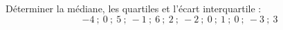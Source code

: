 \begin{exo}
	Déterminer la médiane, les quartiles et l'écart interquartile :
	\[
		-4 \ ; \ 0 \ ; \ 5 \ ; \ -1 \ ; \ 6 \ ; \ 2 \ ; \ -2 \ ; \ 0 \ ; \ 1 \ ; \ 0 \ ; \ -3 \ ; \ 3
	\]
\end{exo}
